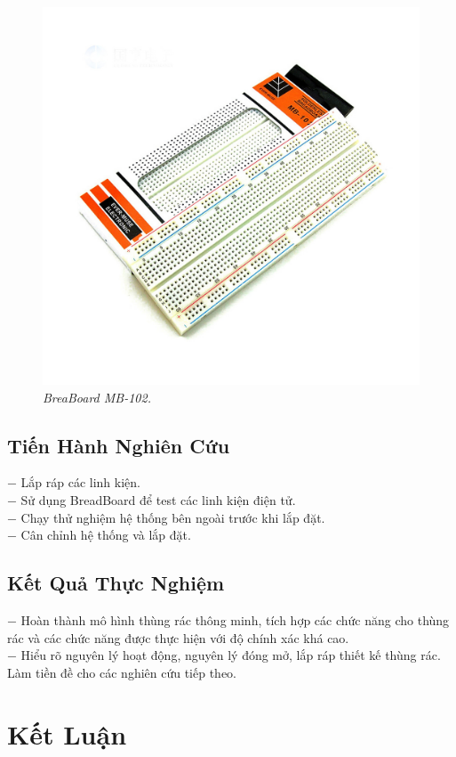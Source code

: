 \documentclass[12pt,a4paper]{article}
\begin{document}
\begin{figure}[ht!]
    \centering
    \includegraphics[scale=0.3]{hinh 6.jpg}
    \caption{\textit{BreaBoard MB-102.}}
    \label{fig6}
\end{figure}
\newpage
\subsection{Tiến Hành Nghiên Cứu}
$-$ Lắp ráp các linh kiện.\\
$-$ Sử dụng BreadBoard để test các linh kiện điện tử.\\
$-$ Chạy thử nghiệm hệ thống bên ngoài trước khi lắp đặt.\\
$-$ Cân chỉnh hệ thống và lắp đặt.\\
\subsection{Kết Quả Thực Nghiệm}
$-$ Hoàn thành mô hình thùng rác thông minh, tích hợp các chức năng cho thùng
rác và các chức năng được thực hiện với độ chính xác khá cao.\\
$-$ Hiểu rõ nguyên lý hoạt động, nguyên lý đóng mở, lắp ráp thiết kế thùng rác. Làm tiền đề cho các nghiên cứu tiếp theo.\\
\section{Kết Luận}
\end{document}
